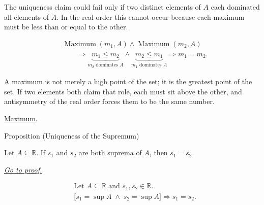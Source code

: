 \begin{remark*}
The uniqueness claim could fail only if two distinct elements of $A$ each dominated all elements of $A$. In the real order this cannot occur because each maximum must be less than or equal to the other.
\end{remark*}

\begin{remark*}
\[
\begin{aligned}
&\operatorname{Maximum}(m_1,A)\land \operatorname{Maximum}(m_2,A)\\
&\qquad\Longrightarrow
\underbrace{m_1\le m_2}_{m_2\text{ dominates }A}
\land
\underbrace{m_2\le m_1}_{m_1\text{ dominates }A}
\Longrightarrow
m_1=m_2.
\end{aligned}
\]
\end{remark*}

\begin{remark*}[Interpretation]
A maximum is not merely a high point of the set; it is the greatest point of the set. If two elements both claim that role, each must sit above the other, and antisymmetry of the real order forces them to be the same number.
\end{remark*}

\begin{remark*}[Dependencies]
\hyperref[def:maximum]{Maximum}.
\end{remark*}


\begin{propositionbox}{Proposition (Uniqueness of the Supremum)}
\begin{proposition}
\label{prop:uniqueness-of-the-supremum}
Let $A\subseteq\mathbb{R}$. If $s_1$ and $s_2$ are both suprema of $A$, then $s_1=s_2$.

\smallskip
\noindent
\hyperref[prf:uniqueness-of-the-supremum]{\textit{Go to proof.}}
\end{proposition}
\end{propositionbox}

\begin{remark*}
\[
\begin{aligned}
&\text{Let }A\subseteq\mathbb{R}\text{ and }s_1,s_2\in\mathbb{R}.\\
&\bigl[s_1=\sup A\;\land\;s_2=\sup A\bigr]
\Longrightarrow
s_1=s_2.
\end{aligned}
\]
\end{remark*}

